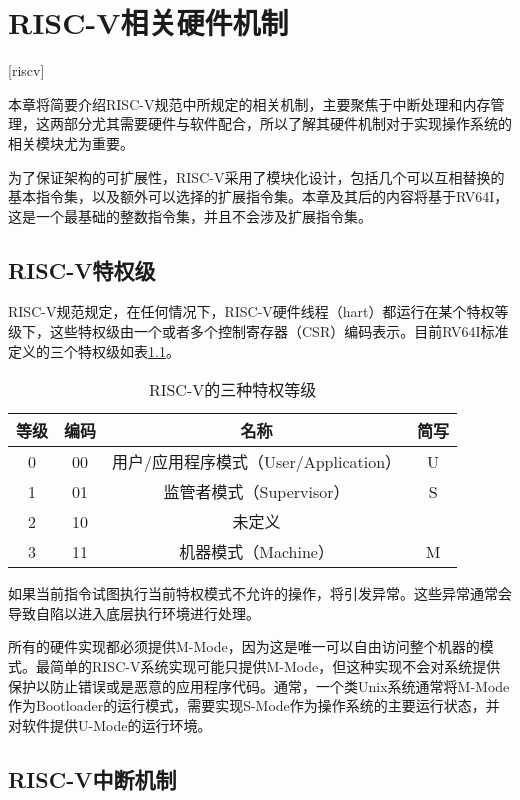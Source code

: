 
\chapter{RISC-V相关硬件机制}[riscv]
\label{chapter:riscv}

本章将简要介绍RISC-V规范中所规定的相关机制，主要聚焦于中断处理和内存管理，这两部分尤其需要硬件与软件配合，所以了解其硬件机制对于实现操作系统的相关模块尤为重要。

为了保证架构的可扩展性，RISC-V采用了模块化设计，包括几个可以互相替换的基本指令集，以及额外可以选择的扩展指令集。本章及其后的内容将基于RV64I，这是一个最基础的整数指令集，并且不会涉及扩展指令集。

\section{RISC-V特权级}

RISC-V规范规定，在任何情况下，RISC-V硬件线程（hart）都运行在某个特权等级下，这些特权级由一个或者多个控制寄存器（CSR）编码表示。目前RV64I标准定义的三个特权级如表\ref{tab:privilege}。

\begin{table}[h]
	\centering
	\setlength{\belowcaptionskip}{2pt}
	\caption{RISC-V的三种特权等级}
	\label{tab:privilege}
	\begin{tabular}{|c|c|c|c|}
		\hline
		等级 & 编码 & 名称                          & 简写 \\ \hline
		0  & 00 & 用户/应用程序模式（User/Application） & U  \\ \hline
		1  & 01 & 监管者模式（Supervisor）           & S  \\ \hline
		2  & 10 & 未定义                         &    \\ \hline
		3  & 11 & 机器模式（Machine）               & M  \\ \hline
	\end{tabular}
\end{table}

如果当前指令试图执行当前特权模式不允许的操作，将引发异常。这些异常通常会导致自陷以进入底层执行环境进行处理。

所有的硬件实现都必须提供M-Mode，因为这是唯一可以自由访问整个机器的模式。最简单的RISC-V系统实现可能只提供M-Mode，但这种实现不会对系统提供保护以防止错误或是恶意的应用程序代码。通常，一个类Unix系统通常将M-Mode作为Bootloader的运行模式，需要实现S-Mode作为操作系统的主要运行状态，并对软件提供U-Mode的运行环境。

\section{RISC-V中断机制}
\label{sec:interrupt}

